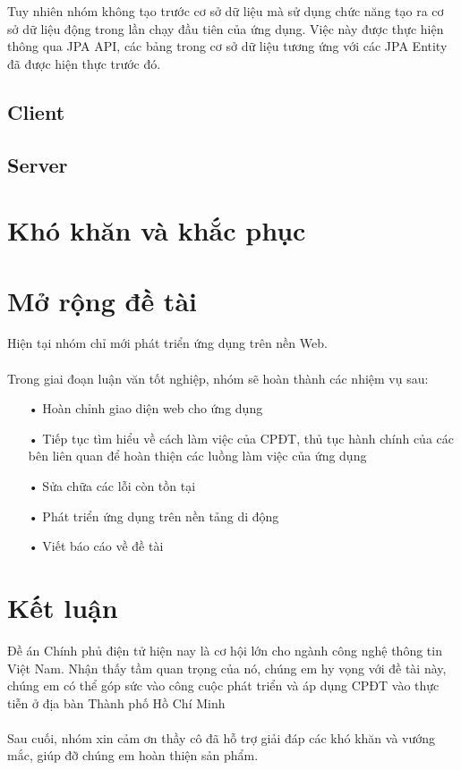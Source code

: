 \documentclass[a4paper]{article}
\begin{document}
Tuy nhiên nhóm không tạo trước cơ sở dữ liệu mà sử dụng chức năng tạo ra cơ sở dữ liệu động trong lần chạy đầu tiên của ứng dụng. Việc này được thực hiện thông qua JPA API, các bảng trong cơ sở dữ liệu tương ứng với các JPA Entity đã được hiện thực trước đó.
\subsection{Client}

\subsection{Server}

\section{Khó khăn và khắc phục}

\section{Mở rộng đề tài}
Hiện tại nhóm chỉ mới phát triển ứng dụng trên nền Web. \\ 
\\
Trong giai đoạn luận văn tốt nghiệp, nhóm sẽ hoàn thành các nhiệm vụ sau:
\begin{itemize}
	\item[•]Hoàn chỉnh giao diện web cho ứng dụng
	\item[•]Tiếp tục tìm hiểu về cách làm việc của CPĐT, thủ tục hành chính của các bên liên quan để hoàn thiện các luồng làm việc của ứng dụng
	\item[•]Sửa chữa các lỗi còn tồn tại
	\item[•]Phát triển ứng dụng trên nền tảng di động
	\item[•]Viết báo cáo về đề tài
\end{itemize}
\section{Kết luận}
Đề án Chính phủ điện tử hiện nay là cơ hội lớn cho ngành công nghệ thông tin Việt Nam. Nhận thấy tầm quan trọng của nó, chúng em hy vọng với đề tài này, chúng em có thể góp sức vào công cuộc phát triển và áp dụng CPĐT vào thực tiễn ở địa bàn Thành phố Hồ Chí Minh \\
\\
Sau cuối, nhóm xin cảm ơn thầy cô đã hỗ trợ giải đáp các khó khăn và vướng mắc, giúp đỡ chúng em hoàn thiện sản phẩm.
\end{document}
